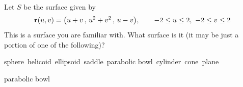 

\begin{question}[M317 2010D]   %
Let $S$ be the surface given by
\begin{equation*}
\mathbf{r}(u, v) = \big( u + v\,,\, u^2 + v^2 \,,\, u - v\big),\qquad
-2 \le u \le 2,\ -2 \le v \le 2
\end{equation*}
This is a surface you are familiar with. What surface is it (it may be 
just a portion of one of the following)? 
\begin{center}
sphere\quad\ 
helicoid\quad\ 
ellipsoid\quad\ 
saddle\quad\ 
parabolic bowl\quad\ 
cylinder\quad\ 
cone\quad\ 
plane
\end{center}
\end{question}

%

\begin{answer} 
      parabolic bowl
\end{answer}

